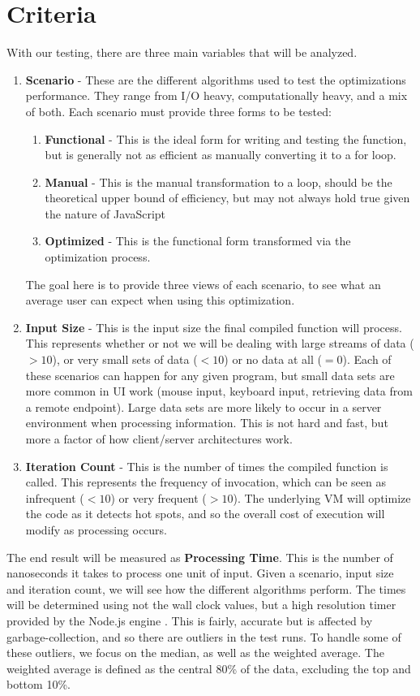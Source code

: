 \section{Criteria}

With our testing, there are three main variables that will be analyzed.

\begin{enumerate}
  \item \textbf{Scenario} - These are the different algorithms used to test the optimizations performance. They range from I/O heavy, computationally heavy, and a mix of both.  Each scenario must provide three forms to be tested:
    \begin{enumerate}
      \item \textbf{Functional} - This is the ideal form for writing and testing the function, but is generally not as efficient as manually converting it to a for loop.
      \item \textbf{Manual} - This is the manual transformation to a  loop, should be the theoretical upper bound of efficiency, but may not always hold true given the nature of JavaScript
      \item \textbf{Optimized} - This is the functional form transformed via the optimization process.  
    \end{enumerate}
  The goal here is to provide three views of each scenario, to see what an average user can expect when using this optimization.
  \item \textbf{Input Size} - This is the input size the final compiled function will process.  This represents whether or not we will be dealing with large streams of data ($> 10$), or very small sets of data ($< 10$) or no data at all ($=0$).  Each of these scenarios can happen for any given program, but small data sets are more common in UI work (mouse input, keyboard input, retrieving data from a remote endpoint).  Large data sets are more likely to occur in a server environment when processing information. This is not hard and fast, but more a factor of how client/server architectures work. 
  \item \textbf{Iteration Count} - This is the number of times the compiled function is called.  This represents the frequency of invocation, which can be seen as infrequent ($< 10$) or very frequent ($> 10$).  The underlying VM will optimize the code as it detects hot spots, and so the overall cost of execution will modify as processing occurs.  
\end{enumerate}

The end result will be measured as \textbf{Processing Time}. This is the number of nanoseconds it takes to process one unit of input.  Given a scenario, input size and iteration count, we will see how the different algorithms perform.   The times will be determined using not the wall clock values, but a high resolution timer provided by the Node.js engine \cite{nodehr16}.  This is fairly, accurate but is affected by garbage-collection, and so there are outliers in the test runs. To handle some of these outliers, we focus on the median, as well as the weighted average. The weighted average is defined as the central 80\% of the data, excluding the top and bottom 10\%.
